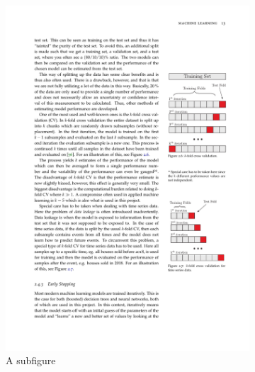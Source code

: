 \begin{figure}
    \begin{subfigure}{.5\textwidth}
        \includegraphics[trim={14cm 17cm 1.95cm 6.5cm}, clip, width=.8\linewidth]{figures/MasterThesis-cross-validation}
        \caption{A subfigure}
        \label{fig:sub1}
    \end{subfigure}%
    \begin{subfigure}{.5\textwidth}

\end{subfigure}
\end{figure}
